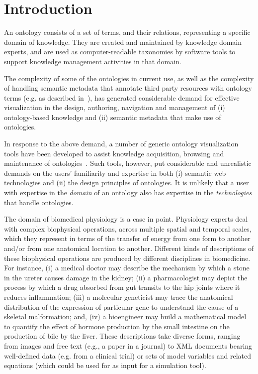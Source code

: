 \section{Introduction}                                                                   %

An ontology consists of a set of terms, and their relations, representing a specific domain of knowledge. They are created and maintained by knowledge domain experts, and are used as computer-readable taxonomies by software tools to support knowledge management activities in that domain.

The complexity of some of the ontologies in current use, as well as the complexity of handling semantic metadata that annotate third party resources with ontology terms (e.g. as described in~\cite{BHW+11}), has generated considerable demand for effective visualization in the design, authoring, navigation and management of (i) ontology-based knowledge and (ii) semantic metadata that make use of ontologies.

In response to the above demand, a number of generic ontology visualization tools have been developed to assist knowledge acquisition, browsing and maintenance of ontologies~\cite{KHL+07}. Such tools, however, put considerable and unrealistic demands on the users' familiarity and expertise in both (i) semantic web technologies and (ii) the design principles of ontologies. It is unlikely that a user with expertise in the \emph{domain} of an ontology also has expertise in the \emph{technologies} that handle ontologies.

The domain of biomedical physiology is a case in point. Physiology experts deal with complex biophysical operations, across multiple spatial and temporal scales, which they represent in terms of the transfer of energy from one form to another and/or from one anatomical location to another. Different kinds of descriptions of these biophysical operations are produced by different disciplines in biomedicine. For instance, (i) a medical doctor may describe the mechanism by which a stone in the ureter causes damage in the kidney; (ii) a pharmacologist may depict the process by which a drug absorbed from gut transits to the hip joints where it reduces inflammation; (iii) a molecular geneticist may trace the anatomical distribution of the expression of particular gene to understand the cause of a skeletal malformation; and, (iv) a bioengineer may build a mathematical model to quantify the effect of hormone production by the small intestine on the production of bile by the liver. These descriptions take diverse forms, ranging from images and free text (e.g., a paper in a journal) to XML documents bearing well-defined data (e.g. from a clinical trial) or sets of model variables and related equations (which could be used for as input for a simulation tool).

